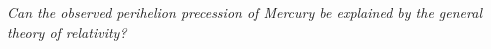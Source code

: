 \textit{Can the observed perihelion precession of Mercury be explained by the general theory of relativity?}





